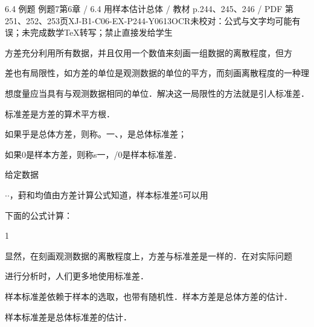 \begin{bankitem}{6.4 例题 例题7}{第6章 / 6.4 用样本估计总体 / 教材 p.244、245、246 / PDF 第251、252、253页}{XJ-B1-C06-EX-P244-Y0613}{OCR未校对：公式与文字均可能有误；未完成数学TeX转写；禁止直接发给学生}
\begin{ocrdraft}
方差充分利用所有数据，并且仅用一个数值来刻画一组数据的离散程度，但方
\par
差也有局限性，如方差的单位是观测数据的单位的平方，而刻画离散程度的一种理
\par
想度量应当具有与观测数据相同的单位．解决这一局限性的方法就是引人标准差．
\par
标准差是方差的算术平方根．
\par
如果乎是总体方差，则称。一、，是总体标准差；
\par
如果0是样本方差，则称s一，/0是样本标准差．
\par
给定数据
\par
\ensuremath{\cdot}\ensuremath{\cdot}，葑和均值由方差计算公式知道，样本标准差5可以用
\par
下面的公式计算：
\par
1
\par
[教材p.246 / PDF第253页]
\par
显然，在刻画观测数据的离散程度上，方差与标准差是一样的．在对实际问题
\par
进行分析时，人们更多地使用标准差．
\par
样本标准差依赖于样本的选取，也带有随机性．样本方差是总体方差的估计．
\par
样本标准差是总体标准差的估计．
\end{ocrdraft}
\end{bankitem}
